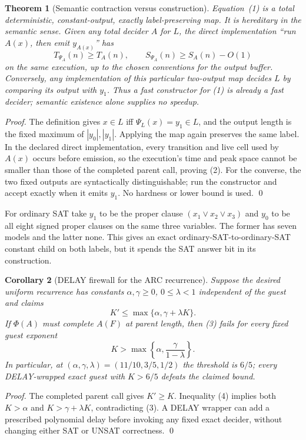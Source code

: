 \documentclass[11pt]{article}
\newtheorem{theorem}{Theorem}
\newtheorem{corollary}[theorem]{Corollary}
\begin{document}
\begin{theorem}[Semantic contraction versus construction]
Equation~(1) is a total deterministic, constant-output, exactly
label-preserving map.  It is hereditary in the semantic sense.  Given any
total decider $A$ for $L$, the direct implementation ``run $A(x)$, then emit
$y_{A(x)}$'' has
\[
 T_{\Psi_A}(n)\ge T_A(n),\qquad
 S_{\Psi_A}(n)\ge S_A(n)-O(1)
 \tag{2}
\]
on the same execution, up to the chosen conventions for the output buffer.
Conversely, any implementation of this \emph{particular two-output map} decides
$L$ by comparing its output with $y_1$.  Thus a fast constructor for (1) is
already a fast decider; semantic existence alone supplies no speedup.
\end{theorem}
\begin{proof}
The definition gives $x\in L$ iff $\Psi_L(x)=y_1\in L$, and the output length
is the fixed maximum of $|y_0|,|y_1|$.  Applying the map again preserves the
same label.  In the declared direct implementation, every transition and live
cell used by $A(x)$ occurs before emission, so the execution's time and peak
space cannot be smaller than those of the completed parent call, proving (2).
For the converse, the two fixed outputs are syntactically distinguishable; run
the constructor and accept exactly when it emits $y_1$.  No hardness or lower
bound is used. \qed
\end{proof}

For ordinary SAT take $y_1$ to be the proper clause
$(x_1\vee x_2\vee x_3)$ and $y_0$ to be all eight signed proper clauses on
the same three variables.  The former has seven models and the latter none.
This gives an exact ordinary-SAT-to-ordinary-SAT constant child on both labels,
but it spends the SAT answer bit in its construction.

\begin{corollary}[DELAY firewall for the ARC recurrence]
Suppose the desired uniform recurrence has constants
$\alpha,\gamma\ge0$, $0\le\lambda<1$ independent of the guest and claims
\[
 K'\le \max\{\alpha,\gamma+\lambda K\}. \tag{3}
\]
If $\Phi(A)$ must complete $A(F)$ at parent length, then (3) fails for every
fixed guest exponent
\[
 K>\max\left\{\alpha,\frac{\gamma}{1-\lambda}\right\}. \tag{4}
\]
In particular, at $(\alpha,\gamma,\lambda)=(11/10,3/5,1/2)$ the threshold is
$6/5$; every DELAY-wrapped exact guest with $K>6/5$ defeats the claimed bound.
\end{corollary}
\begin{proof}
The completed parent call gives $K'\ge K$.  Inequality (4) implies both
$K>\alpha$ and $K>\gamma+\lambda K$, contradicting (3).  A DELAY wrapper can
add a prescribed polynomial delay before invoking any fixed exact decider,
without changing either SAT or UNSAT correctness. \qed
\end{proof}
\end{document}
